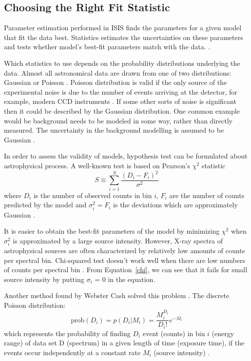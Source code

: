 \subsection{Choosing the Right Fit Statistic}
Parameter estimation performed in ISIS finds the parameters for a given model that fit the data best. Statistics estimates the uncertainties on these parameters and tests whether model's best-fit parameters match with the data. \citep{Arnaud1999}. \par 
Which statistics to use depends on the probability distributions underlying the data. Almost all astronomical data are drawn from one of two distributions: Gaussian or Poisson \citep{Arnaud1999}. Poisson distribution is valid if the only source of the experimental noise is due to the number of events arriving at the detector, for example, modern CCD instruments \citep{Arnaud1999}. If some other sorts of noise is significant then it could be described by the Gaussian distribution. One common example would be background needs to be modeled in some way, rather than directly measured. The uncertainty in the background modelling is assumed to be Gaussian \citep{Arnaud1999}. \par

In order to assess the validity of models, hypothesis test can be formulated about astrophysical process. A well-known test is based on Pearson’s $\chi^2$ statistic
\begin{equation}
    S \equiv \sum_{i = 1}^{N}\dfrac{(D_i - F_i)^2}{\sigma^2}
    \label{chi}
\end{equation}
where $D_i$ is the number of observed counts in bin $i$, $F_i$ are the number of counts predicted by the model and $\sigma_i^2 = F_i$ is the deviations which are approximately Gaussian \citep{Lampton1976}. 

It is easier to obtain the best-fit parameters of the model by minimizing $\chi^2$ when $\sigma_i^2$ is approximated by a large source intensity. However, X-ray spectra of astrophysical sources are often characterized by relatively low amounts of counts per spectral bin.  Chi-squared test doesn't work well when there are low numbers of counts per spectral bin \citep{Kaastra2017}. From Equation~\ref{chi}, we can see that it fails for small source intensity by putting $\sigma_i$ = 0 in the equation.\par 
Another method found by Webster Cash solved this problem \citep{Cash1979}. The discrete Poisson distribution:
\begin{equation}
    \text{prob}(D_i) = p(D_i|M_i) = \dfrac{M_i^{D_i}}{D_i!}e^{-M_i}
    \label{poisson}
\end{equation}
which represents the probability of finding $D_i$ event (counts) in bin $i$ (energy range) of data set D (spectrum) in a given length of time (exposure time), if the events occur independently at a constant rate $M_i$ (source intensity) \citep{Siemiginowska09}.\par 

